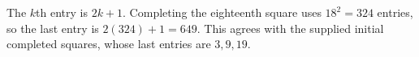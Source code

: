 The $k$th entry is $2k+1$. Completing the eighteenth square uses $18^2=324$ entries, so the last entry is $2(324)+1=\boxed{649}$. This agrees with the supplied initial completed squares, whose last entries are $3,9,19$.
